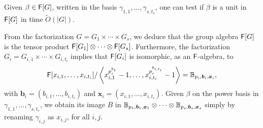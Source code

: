 
\begin{proposition}
  Given $\beta \in {\mathsf{F}}[G]$, written in the basis
  $\gamma_{1,1},\dots,\gamma_{s,t_s}$, one can test if $\beta$ is a
  unit in ${\mathsf{F}}[G]$ in time $\tilde{O}(|G|)$.
\end{proposition}
From the factorization $G = G_1 \times \cdots \times G_s$, we deduce
that the group algebra ${\mathsf{F}}[G]$ is the tensor product ${\mathsf{F}}[G_1]
\otimes \cdots \otimes {\mathsf{F}}[G_s]$. Furthermore, the 
factorization $G_i = G_{i,1} \times \cdots \times G_{i,t_i}$
implies that ${\mathsf{F}}[G_i]$ is isomorphic, as an ${\mathsf{F}}$-algebra, to
$${\mathsf{F}}[x_{i,1},\dots,x_{i,t_i}]/\left \langle
x_{i,1}^{p_i^{b_{1}}}-1,\dots,x_{i,t_i}^{p_i^{b_{i,t_i}}}-1\right\rangle
=\mathbb{B}_{p_i,\boldsymbol{b}_i,\boldsymbol{x}_i},$$ with $\boldsymbol{b}_i
= (b_{i,1},\dots,b_{i,t_i})$ and $\boldsymbol{x}_i =
(x_{i,1},\dots,x_{i,t_i})$. Given $\beta$ on the power basis in
$\gamma_{1,1},\dots,\gamma_{s,t_s}$, we obtain its image $B$ in
$\mathbb{B}_{p_1,\boldsymbol{b}_1,\boldsymbol{x}_1} \otimes \cdots \otimes
\mathbb{B}_{p_s,\boldsymbol{b}_s,\boldsymbol{x}_s}$ simply by renaming
$\gamma_{i,j}$ as $x_{i,j}$, for all $i,j$.

